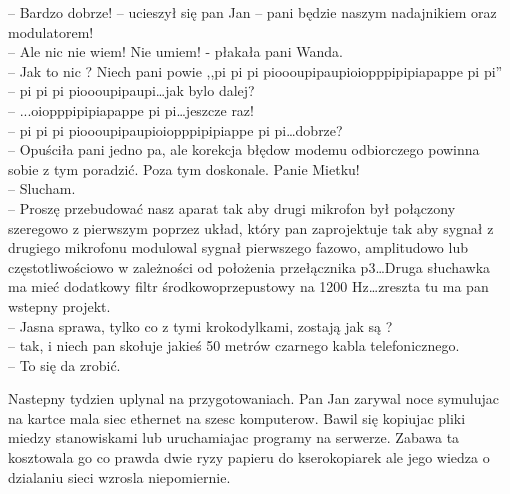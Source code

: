 \documentclass[a4paper,polish,titlepage,12pt]{article}
\begin{document}
-- Bardzo dobrze! -- ucieszył się pan Jan -- pani będzie naszym nadajnikiem oraz modulatorem!\\
-- Ale nic nie wiem! Nie umiem! - płakała pani Wanda.\\
-- Jak to nic ? Niech pani powie ,,pi pi pi pioooupipaupioiopppipipiapappe pi pi''\\
-- pi pi pi pioooupipaupi\dots jak bylo dalej?\\
-- ...oiopppipipiapappe pi pi\dots jeszcze raz!\\
-- pi pi pi pioooupipaupioiopppipipiappe pi pi\dots dobrze?\\
-- Opuściła pani jedno pa, ale korekcja błędow modemu odbiorczego powinna sobie z tym poradzić. Poza tym doskonale. Panie Mietku!\\
-- Slucham.\\
-- Proszę przebudować nasz aparat tak aby drugi mikrofon był połączony szeregowo z pierwszym poprzez układ, który pan zaprojektuje tak aby sygnał z 
drugiego mikrofonu modulowal sygnał pierwszego fazowo, amplitudowo lub częstotliwościowo w zależności od położenia przełącznika p3\dots Druga słuchawka
 ma mieć dodatkowy filtr środkowoprzepustowy na 1200 Hz\dots zreszta tu ma pan wstepny projekt.\\
-- Jasna sprawa, tylko co z tymi krokodylkami, zostają jak są ?\\
-- tak, i niech pan skołuje jakieś 50 metrów czarnego kabla telefonicznego.\\
-- To się da zrobić.

Nastepny tydzien uplynal na przygotowaniach. Pan Jan zarywal noce symulujac na kartce mala siec ethernet na szesc komputerow. Bawil się kopiujac pliki miedzy stanowiskami lub uruchamiajac programy na serwerze. Zabawa ta kosztowala go co prawda dwie ryzy papieru do kserokopiarek ale jego wiedza o dzialaniu sieci wzrosla niepomiernie.
\end{document}
